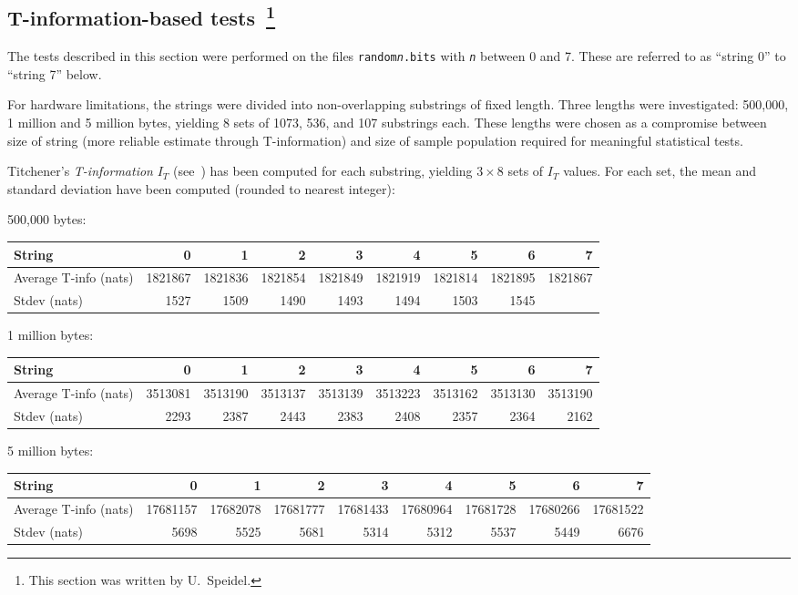 \documentclass[10pt]{article}%
\begin{document}
\subsection[blabla]{T-information-based tests~\footnote{This section was written by U.~Speidel.}}



The tests described  in this section were performed on the files {\tt random{\it n}.bits} with {\tt\it n} between 0 and 7. These are referred to as ``string 0'' to ``string 7'' below.


For hardware limitations, the strings were divided into non-overlapping substrings of fixed length. Three lengths were investigated: 500,000, 1 million and 5 million bytes, yielding 8 sets of 1073, 536, and 107 substrings each. These lengths were chosen as a compromise between size of string (more reliable estimate through T-information) and size of sample population required for meaningful statistical tests.

Titchener's {\em T-information} $I_T$ (see~\cite{titchener-96}) has been computed for each substring, yielding $3 \times 8$ sets of $I_T$ values. For each set, the mean and standard deviation have been computed (rounded to nearest integer):

500,000 bytes:\\
{\small
\begin{tabular}{ l| r r r r r r r r }
\hline
String & 0 & 1 & 2 & 3 & 4 & 5 & 6 & 7 \\
\hline
Average T-info (nats) & 1821867
 & 1821836
 & 1821854
 & 1821849
 & 1821919
 & 1821814
 & 1821895
 & 1821867 \\
\hline
Stdev (nats) & 1527 & 1509 & 1490 & 1493 & 1494 & 1503 & 1545 \\
\hline
\end{tabular}}

1 million bytes:\\
{\small
\begin{tabular}{ l| r r r r r r r r }
\hline
String & 0 & 1 & 2 & 3 & 4 & 5 & 6 & 7 \\
\hline
Average T-info (nats) & 3513081 & 3513190 & 3513137 & 3513139 & 3513223 & 3513162 & 3513130 & 3513190 \\
\hline
Stdev (nats) & 2293 & 2387 & 2443 & 2383 & 2408 & 2357 & 2364 & 2162 \\
\hline
\end{tabular}}

5 million bytes:\\
{\small
\begin{tabular}{ l| r r r r r r r r }
\hline
String & 0 & 1 & 2 & 3 & 4 & 5 & 6 & 7 \\
\hline
Average T-info (nats) & 17681157 & 17682078 & 17681777 & 17681433 & 17680964 & 17681728 & 17680266 & 17681522\\
\hline
Stdev (nats) & 5698 & 5525 & 5681 & 5314 & 5312 & 5537 & 5449 & 6676\\
\hline
\end{tabular}}
\end{document}
